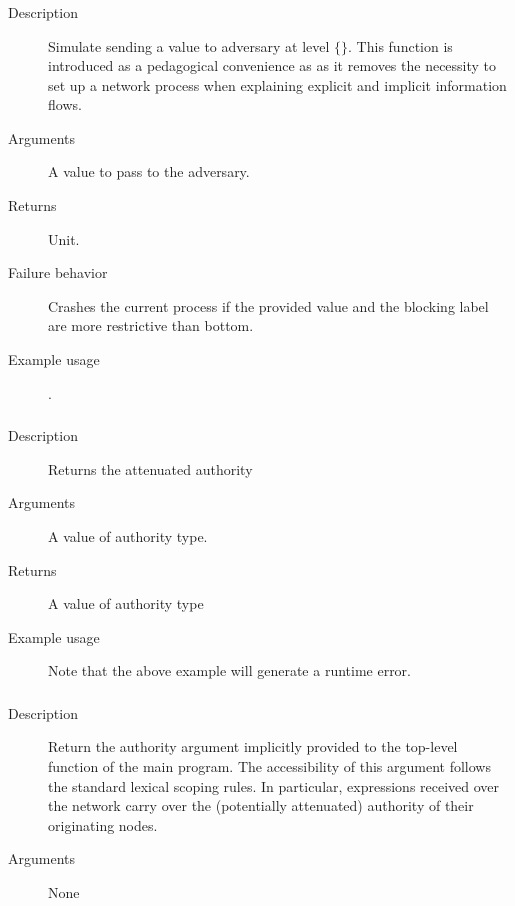 \subsubsection{}
\begin{description}
    \item [Description] Simulate sending a value to adversary at level $\{\}$. This function is introduced as a 
    pedagogical convenience as as it removes the necessity to set up a network process when explaining explicit and implicit information flows.
    \item [Arguments] A value to pass to the adversary.
    \item [Returns] Unit.
    \item [Failure behavior] Crashes the current process if the provided value and the blocking label are more restrictive than bottom.
    \item [Example usage] . 
\end{description}

\subsubsection{}
\begin{description}
    \item [Description] Returns the attenuated authority 
    \item [Arguments] A value of authority type.
    \item [Returns] A value of authority type
    \item [Example usage]  Note that the above example will generate a runtime error.
\end{description}


\subsubsection{}

\begin{description}
    \item [Description] Return the authority argument implicitly provided to the top-level function of the main program.
The accessibility of this argument follows the standard lexical scoping rules. In particular, expressions received over the network carry over the (potentially attenuated) authority of their originating nodes.
    \item [Arguments] None
\end{description}

